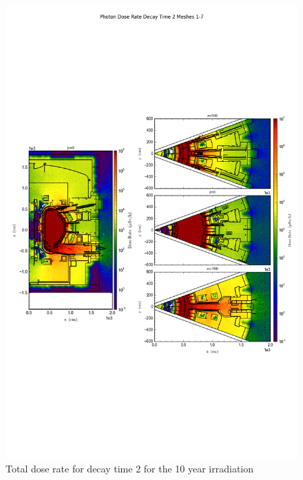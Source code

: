 \documentclass[12pt]{article}
\begin{document}
\begin{figure}[ht!]
\centering
\includegraphics[trim={0cm 8cm, 0cm 8cm},clip,scale=0.75]{../plots/final_model/10year/Photon_Dose_Rate_Decay_Time_2_Meshes_1-7.png}
\caption{Total dose rate for decay time 2 for the 10 year irradiation}
\label{fig:photons_10y_dc2_nob4c_dose}
\end{figure}
\end{document}
